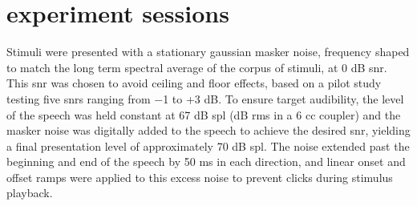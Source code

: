 \section{experiment sessions}

Stimuli were presented with a stationary gaussian masker noise, frequency shaped to match the long term spectral average of the corpus of stimuli, at 0 dB \ac{snr}.  This \ac{snr} was chosen to avoid ceiling and floor effects, based on a pilot study testing five \ac{snr}s ranging from −1 to +3 dB.  To ensure target audibility, the level of the speech was held constant at 67 dB \ac{spl} (dB \ac{rms} in a 6 cc coupler) and the masker noise was digitally added to the speech to achieve the desired \ac{snr}, yielding a final presentation level of approximately 70 dB \ac{spl}.  The noise extended past the beginning and end of the speech by 50 ms in each direction, and linear onset and offset ramps were applied to this excess noise to prevent clicks during stimulus playback.

